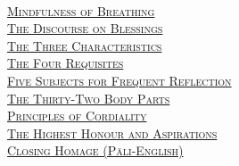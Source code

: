 {  {\libertinusFont\selectfont\textbf{\textsc{\ifafive\fontsize{18}{12}\fi\ifninebythirteen\fontsize{13}{8.5}\fi\ifbfive\fontsize{22}{18}\fi\selectfont{}}}}\\
  \textsc{\ifafive\fontsize{14.4}{28}\fi\ifninebythirteen\fontsize{8.7}{17}\fi\ifbfive\fontsize{16}{33.5}\fi\selectfont
    \hyperref[mindfulness-of-breathing]{Mindfulness of Breathing} \ifdigital\else\pageref{mindfulness-of-breathing}\fi\\
    \hyperref[discourse-on-blessings]{The Discourse on Blessings} \ifdigital\else\pageref{discourse-on-blessings}\fi\\
    \hyperref[three-characteristics]{The Three Characteristics} \ifdigital\else\pageref{three-characteristics}\fi\\
    \hyperref[four-requisites]{The Four Requisites} \ifdigital\else\pageref{four-requisites}\fi\\
    \hyperref[five-reflections]{Five Subjects for Frequent Reflection} \ifdigital\else\pageref{five-reflections}\fi\\
    \hyperref[32-parts]{The Thirty-Two Body Parts} \ifdigital\else\pageref{32-parts}\fi\\
    \hyperref[principles-of-cordiality]{Principles of Cordiality} \ifdigital\else\pageref{principles-of-cordiality}\fi\\
    \hyperref[highest-honour-aspirations]{The Highest Honour and Aspirations} \ifdigital\else\pageref{highest-honour-aspirations}\fi\\
    \hyperref[closing-homage]{Closing Homage (Pāli-English)} \ifdigital\else\pageref{closing-homage}\fi\\
  }

  \ifafive\vspace{1.0cm}\fi
  \ifninebythirteen\vspace{0.8cm}\fi
  \ifbfive\vspace{1.0cm}\fi

}

